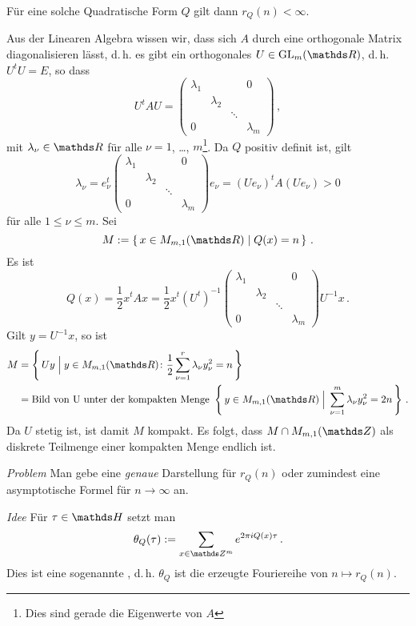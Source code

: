 \begin{lemm}
Für eine solche Quadratische Form $Q$ gilt dann $r_Q(n) < \infty$.
\end{lemm}

\begin{bewe}
Aus der Linearen Algebra wissen wir, dass sich $A$ durch eine orthogonale Matrix diagonalisieren lässt, d.\,h. es gibt ein orthogonales $U \in \GL_m(\RR)$, d.\,h. $U^tU = E$, so dass
\[
	U^tAU =
	\begin{pmatrix}
	\lambda_1 & & & 0 \\
	& \lambda_2 \\
	& & \ddots \\
	0 & & & \lambda_m
	\end{pmatrix}
	\,,
\]
mit $\lambda_\nu \in \RR$ für alle $\nu=1$, \ldots, $m$\footnote{Dies sind gerade die Eigenwerte von $A$}.
Da $Q$ positiv definit ist, gilt
\[
	\lambda_\nu = 
	e_\nu^t 	
			\begin{pmatrix}
			\lambda_1 & & & 0 \\
			& \lambda_2 \\
			& & \ddots \\
			0 & & & \lambda_m
			\end{pmatrix}
		e_\nu
	= (Ue_\nu)^tA(Ue_\nu)
	> 0
\]
für alle $1 \leq \nu \leq m$. Sei
\[
	M
	:= \Set{x\in M_{m,1}(\RR) \mid Q(x) = n}
	\,.
\]
Es ist
\[
	Q(x)
	= \frac{1}{2}x^tAx
	= \frac{1}{2} x^t(U ^t)^{-1}
			\begin{pmatrix}
			\lambda_1 & & & 0 \\
			& \lambda_2 \\
			& & \ddots \\
			0 & & & \lambda_m
			\end{pmatrix}
		U^{-1}x
		\,.
\]
Gilt $y = U^{-1} x$, so ist
\begin{align*}
	M &= \Set{Uy \;\Big|\; y \in M_{m,1}(\RR)\colon \frac{1}{2} \sum_{\nu=1}^r \lambda_\nu y_\nu^2 = n} \\
	&= \text{Bild von U unter der kompakten Menge } \Set{y \in M_{m,1}(\RR) \;\Big|\; \sum_{\nu=1}^m \lambda_\nu y_\nu^2 = 2n}
	\,.
\end{align*}
Da $U$ stetig ist, ist damit $M$ kompakt.
Es folgt, dass $M \cap M_{m,1}(\ZZ)$ als diskrete Teilmenge einer kompakten Menge endlich ist.
\end{bewe}

\emph{Problem} Man gebe eine \emph{genaue} Darstellung für $r_Q(n)$ oder zumindest eine asymptotische Formel für $n \to \infty$ an.

\emph{Idee} Für $\tau\in\HH$ setzt man
\[
	\theta_Q(\tau)
	:= \sum_{x\in\ZZ^m} e^{2\pi i Q(x) \tau}
	\,.
\]
Dies ist eine sogenannte , d.\,h. $\theta_Q$ ist die erzeugte Fouriereihe von $n \mapsto r_Q(n)$.